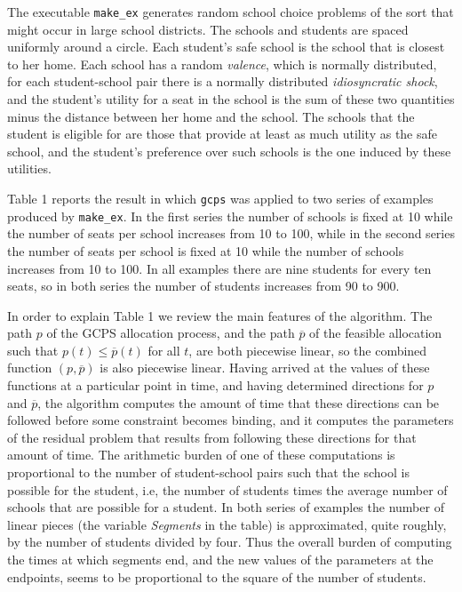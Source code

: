 \documentclass[12pt, A4paper]{article}
\theoremstyle{definition}
\newcommand{\barp}{\overline{p}}
\begin{document}
\begin{appendix}
The executable \texttt{make\_ex} generates random school choice problems of the sort that might occur in large school districts.  The schools and students are spaced uniformly around a circle.  Each student's safe school is the school that is closest to her home.  Each school has a random \emph{valence}, which is normally distributed, for each student-school pair there is a normally distributed \emph{idiosyncratic shock}, and the student's utility for a seat in the school is the sum of these two quantities minus the distance between her home and the school.  The schools that the student is eligible for are those that provide at least as much utility as the safe school, and the student's preference over such schools is the one induced by these utilities.

Table 1 reports the result in which \texttt{gcps} was applied to two series of examples produced by \texttt{make\_ex}.  In the first series the number of schools is fixed at 10 while the number of seats per school increases from 10 to 100, while in the second series the number of seats per school is fixed at 10 while the number of schools increases from 10 to 100.  In all examples there are nine students for every ten seats, so in both series the number of students increases from 90 to 900.

In order to explain Table 1 we review the main features of the algorithm.  The path $p$ of the GCPS allocation process, and the path $\barp$ of the feasible allocation such that $p(t) \le \barp(t)$ for all $t$, are both piecewise linear, so the combined function $(p,\barp)$ is also piecewise linear.  Having arrived at the values of these functions at a particular point in time, and having determined directions for $p$ and $\barp$, the algorithm computes the amount of time that these directions can be followed before some constraint becomes binding, and it computes the parameters of the residual problem that results from following these directions for that amount of time.  The arithmetic burden of one of these computations is proportional to the number of student-school pairs such that the school is possible for the student, i.e, the number of students times the average number of schools that are possible for a student.  In both series of examples the number of linear pieces (the variable \emph{Segments} in the table) is approximated, quite roughly, by the number of students divided by four.  Thus the overall burden of computing the times at which segments end, and the new values of the parameters at the endpoints, seems to be proportional to the square of the number of students.


\end{appendix}
\end{document}
